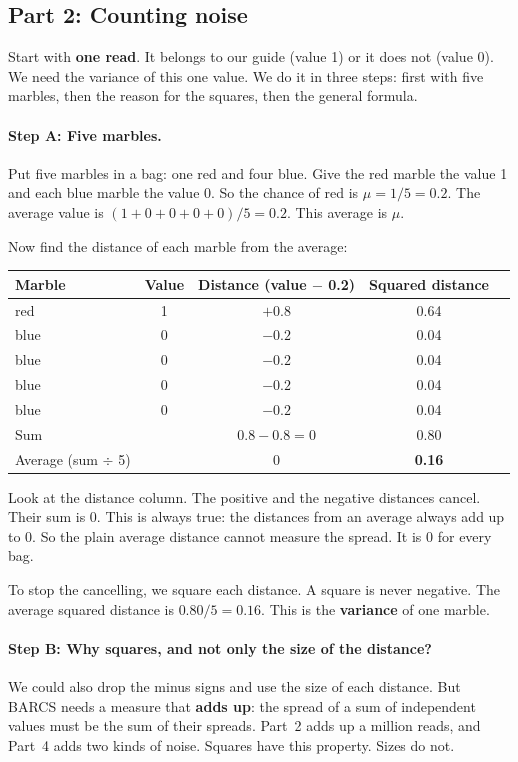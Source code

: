 \subsection{Part 2: Counting noise}

Start with \textbf{one read}. It belongs to our guide (value 1) or it does
not (value 0). We need the variance of this one value. We do it in three
steps: first with five marbles, then the reason for the squares, then the
general formula.

\paragraph{Step A: Five marbles.} Put five marbles in a bag: one red and
four blue. Give the red marble the value 1 and each blue marble the value 0.
So the chance of red is $\mu = 1/5 = 0.2$. The average value is
$(1 + 0 + 0 + 0 + 0) / 5 = 0.2$. This average is $\mu$.

Now find the distance of each marble from the average:

\begin{center}
\begin{tabular}{@{}lcccc@{}}
\toprule
Marble & Value & Distance (value $-$ 0.2) & Squared distance\\
\midrule
red & 1 & $+0.8$ & 0.64\\
blue & 0 & $-0.2$ & 0.04\\
blue & 0 & $-0.2$ & 0.04\\
blue & 0 & $-0.2$ & 0.04\\
blue & 0 & $-0.2$ & 0.04\\
\midrule
Sum & & $0.8 - 0.8 = 0$ & 0.80\\
Average (sum $\div$ 5) & & 0 & \textbf{0.16}\\
\bottomrule
\end{tabular}
\end{center}

Look at the distance column. The positive and the negative distances cancel.
Their sum is 0. This is always true: the distances from an average always
add up to 0. So the plain average distance cannot measure the spread. It is
0 for every bag.

To stop the cancelling, we square each distance. A square is never negative.
The average squared distance is $0.80 / 5 = 0.16$. This is the
\textbf{variance} of one marble.

\paragraph{Step B: Why squares, and not only the size of the distance?}
We could also drop the minus signs and use the size of each distance. But
BARCS needs a measure that \textbf{adds up}: the spread of a sum of
independent values must be the sum of their spreads. Part~2 adds up a
million reads, and Part~4 adds two kinds of noise. Squares have this
property. Sizes do not.

